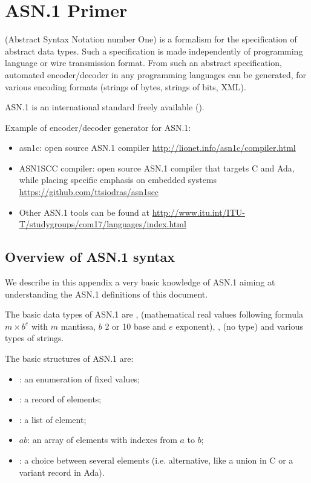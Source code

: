 \chapter{ASN.1 Primer}
\label{asn1-primer}

 (Abstract Syntax Notation number One) is a formalism
for the specification of abstract data types. Such a specification is
made independently of programming language or wire transmission
format. From such an abstract specification, automated encoder/decoder
in any programming languages can be generated, for various encoding
formats (strings of bytes, strings of bits, XML).

ASN.1 is an international standard freely available
(\cite{asn1-standard}).

Example of encoder/decoder generator for ASN.1:
\begin{itemize}
\item asn1c: open source ASN.1 compiler
  \url{http://lionet.info/asn1c/compiler.html}
\item ASN1SCC compiler: open source ASN.1 compiler that targets C and
  Ada, while placing specific emphasis on embedded systems
  \url{https://github.com/ttsiodras/asn1scc}
\item Other ASN.1 tools can be found at
  \url{http://www.itu.int/ITU-T/studygroups/com17/languages/index.html}
\end{itemize}

\section{Overview of ASN.1 syntax}

We describe in this appendix a very basic knowledge of ASN.1 aiming at
understanding the ASN.1 definitions of this document.

The basic data types of ASN.1 are , 
(mathematical real values following formula $m \times b^e$ with $m$
mantissa, $b$ 2 or 10 base and $e$ exponent), ,
 (no type) and various types of strings.

The basic structures of ASN.1 are:
\begin{itemize}
\item {}: an
  enumeration of fixed values;
\item {}: a record of
  elements;
\item {}: a list
  of element;
\item {}$a$$b$: an array of elements with indexes
  from $a$ to $b$;
\item {}: a choice between
  several elements (i.e. alternative, like a union in C or a variant
  record in Ada).
\end{itemize}

